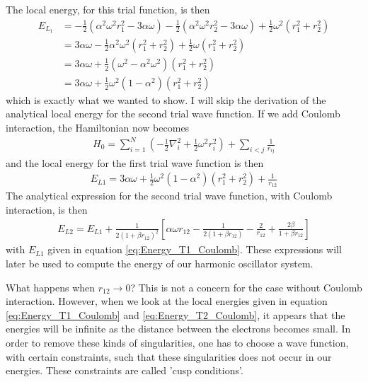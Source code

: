 \documentclass[12pt]{article}
\begin{document}
The local energy, for this trial function, is then
\begin{align}
E_{L_1} &= -\frac{1}{2} (\alpha^2 \omega^2 r_1^2 - 3\alpha \omega)  - \frac{1}{2} (\alpha^2 \omega^2 r_2^2 - 3\alpha \omega) + \frac{1}{2}\omega^2(r_1^2 + r_2^2) \nonumber \\
&= 3 \alpha \omega  - \frac{1}{2}\alpha^2 \omega^2 (r_1^2 + r_2^2) + \frac{1}{2}\omega(r_1^2 + r_2^2) \nonumber \\
&= 3\alpha \omega + \frac{1}{2}(\omega^2 - \alpha^2 \omega^2)(r_1^2 + r_2^2) \nonumber \\
&= 3 \alpha \omega +  \frac{1}{2}\omega^2(1-\alpha^2)(r_1^2 + r_2^2)
\label{eq:Energy_T1}
\end{align}
which is exactly what we wanted to show. I will skip the derivation of the analytical local energy for the second trial wave function. If we add Coulomb interaction, the Hamiltonian now becomes
\begin{align*}
H_0 = \displaystyle \sum_{i=1}^N\left(-\frac{1}{2}\nabla_i^2 + \frac{1}{2}\omega^2r_i^2 \right) + \sum_{i<j}\frac{1}{r_{ij}}
\end{align*}
and the local energy for the first trial wave function is then
\begin{align}
E_{L1} = 3 \alpha \omega +  \frac{1}{2}\omega^2(1-\alpha^2)(r_1^2 + r_2^2) + \frac{1}{r_{12}}
\label{eq:Energy_T1_Coulomb}
\end{align}
The analytical expression for the second trial wave function, with Coulomb interaction, is then
\begin{align}
E_{L2} = E_{L1} + \frac{1}{2(1+\beta r_{12})^2}\left[\alpha \omega r_{12} - \frac{1}{2(1+\beta r_{12})} - \frac{2}{r_{12}} + \frac{2\beta}{1+\beta r_{12}} \right]
\label{eq:Energy_T2_Coulomb}
\end{align}
with $E_{L1}$ given in equation \ref{eq:Energy_T1_Coulomb}. These expressions will later be used to compute the energy of our harmonic oscillator system.

What happens when $r_{12} \to 0$? This is not a concern for the case without Coulomb interaction. However, when we look at the local energies given in equation \ref{eq:Energy_T1_Coulomb} and \ref{eq:Energy_T2_Coulomb}, it appears that the energies will be infinite as the distance between the electrons becomes small. In order to remove these kinds of singularities, one has to choose a wave function, with certain constraints, such that these singularities does not occur in our energies. These constraints are called 'cusp conditions'.
\end{document}
